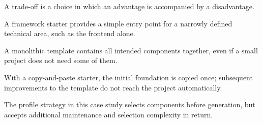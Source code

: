 \begin{beginnerstatement}

A trade-off is a choice in which an advantage is accompanied by a
disadvantage.

A framework starter provides a simple entry point for a narrowly defined
technical area, such as the frontend alone.

A monolithic template contains all intended components together, even if a
small project does not need some of them.

With a copy-and-paste starter, the initial foundation is copied once;
subsequent improvements to the template do not reach the project
automatically.

The profile strategy in this case study selects components before generation,
but accepts additional maintenance and selection complexity in return.

\end{beginnerstatement}
